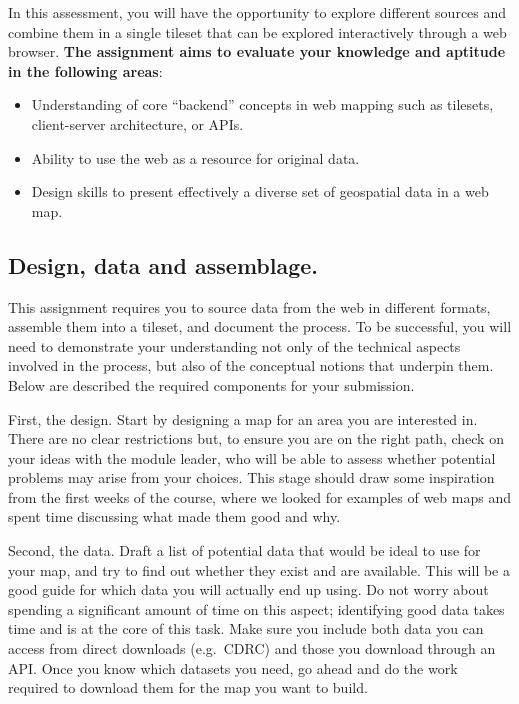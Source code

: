 \documentclass[
  letterpaper,
  DIV=11,
  numbers=noendperiod]{scrreprt}
\begin{document}
In this assessment, you will have the opportunity to explore different
sources and combine them in a single tileset that can be explored
interactively through a web browser. \textbf{The assignment aims to
evaluate your knowledge and aptitude in the following areas}:

\begin{itemize}
\item
  Understanding of core ``backend'' concepts in web mapping such as
  tilesets, client-server architecture, or APIs.
\item
  Ability to use the web as a resource for original data.
\item
  Design skills to present effectively a diverse set of geospatial data
  in a web map.
\end{itemize}

\hypertarget{design-data-and-assemblage.}{%
\subsection*{Design, data and
assemblage.}\label{design-data-and-assemblage.}}

This assignment requires you to source data from the web in different
formats, assemble them into a tileset, and document the process. To be
successful, you will need to demonstrate your understanding not only of
the technical aspects involved in the process, but also of the
conceptual notions that underpin them. Below are described the required
components for your submission.

First, the design. Start by designing a map for an area you are
interested in. There are no clear restrictions but, to ensure you are on
the right path, check on your ideas with the module leader, who will be
able to assess whether potential problems may arise from your choices.
This stage should draw some inspiration from the first weeks of the
course, where we looked for examples of web maps and spent time
discussing what made them good and why.

Second, the data. Draft a list of potential data that would be ideal to
use for your map, and try to find out whether they exist and are
available. This will be a good guide for which data you will actually
end up using. Do not worry about spending a significant amount of time
on this aspect; identifying good data takes time and is at the core of
this task. Make sure you include both data you can access from direct
downloads (e.g.~CDRC) and those you download through an API. Once you
know which datasets you need, go ahead and do the work required to
download them for the map you want to build.
\end{document}
